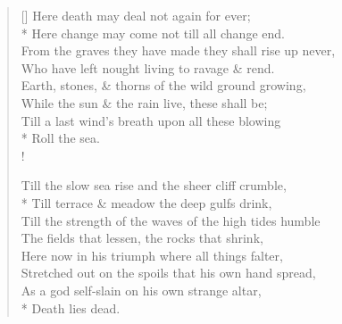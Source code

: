 \documentclass[MAIN]{subfiles}
\begin{document}
\begin{verse}[\versewidth]
Here death may deal not again for ever;\\*
\vin Here change may come not till all change end.\\
From the graves they have made they shall rise up never,\\
\vin Who have left nought living to ravage \& rend.\\
Earth, stones, \& thorns of the wild ground growing,\\
\vin While the sun \& the rain live, these shall be;\\
Till a last wind's breath upon all these blowing\\*
\vin \vin \vin Roll the sea.\\!

Till the slow sea rise and the sheer cliff crumble,\\*
\vin Till terrace \& meadow the deep gulfs drink,\\
Till the strength of the waves of the high tides humble\\
\vin The fields that lessen, the rocks that shrink,\\
Here now in his triumph where all things falter,\\
\vin Stretched out on the spoils that his own hand spread,\\
As a god self-slain on his own strange altar,\\*
\vin \vin \vin Death lies dead.
\end{verse}
\end{document}
